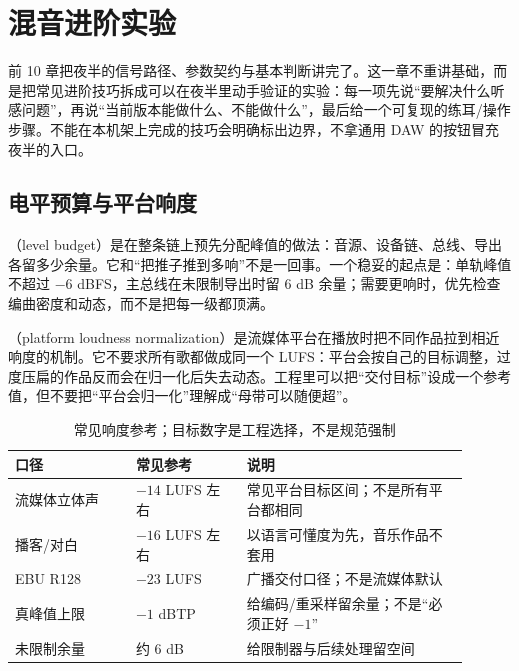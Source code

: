 \chapter{混音进阶实验}
\label{chap:advanced-lab}


前 10 章把夜半的信号路径、参数契约与基本判断讲完了。这一章不重讲基础，而是把常见进阶技巧拆成可以在夜半里动手验证的实验：每一项先说“要解决什么听感问题”，再说“当前版本能做什么、不能做什么”，最后给一个可复现的练耳/操作步骤。不能在本机架上完成的技巧会明确标出边界，不拿通用 DAW 的按钮冒充夜半的入口。

\section{电平预算与平台响度}

（level budget）是在整条链上预先分配峰值的做法：音源、设备链、总线、导出各留多少余量。它和“把推子推到多响”不是一回事。一个稳妥的起点是：单轨峰值不超过 $-6$ dBFS，主总线在未限制导出时留 6 dB 余量；需要更响时，优先检查编曲密度和动态，而不是把每一级都顶满。

（platform loudness normalization）是流媒体平台在播放时把不同作品拉到相近响度的机制。它不要求所有歌都做成同一个 LUFS：平台会按自己的目标调整，过度压扁的作品反而会在归一化后失去动态。工程里可以把“交付目标”设成一个参考值，但不要把“平台会归一化”理解成“母带可以随便超”。

\begin{table}[htbp]
\centering
\small
\begin{tabular}{@{}p{0.24\linewidth}p{0.22\linewidth}p{0.44\linewidth}@{}}
\hline
口径 & 常见参考 & 说明 \\
\hline
流媒体立体声 & $-14$ LUFS 左右 & 常见平台目标区间；不是所有平台都相同 \\
播客/对白 & $-16$ LUFS 左右 & 以语言可懂度为先，音乐作品不套用 \\
EBU R128 & $-23$ LUFS & 广播交付口径；不是流媒体默认 \\
真峰值上限 & $-1$ dBTP & 给编码/重采样留余量；不是“必须正好 $-1$” \\
未限制余量 & 约 6 dB & 给限制器与后续处理留空间 \\
\hline
\end{tabular}
\caption{常见响度参考；目标数字是工程选择，不是规范强制}
\label{tab:advanced-loudness-targets}
\end{table}

